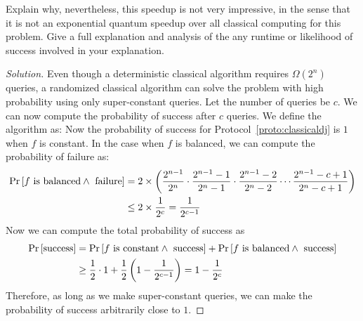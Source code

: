 \begin{solution}[label=ques:1c]
  \begin{question}
    Explain why, nevertheless, this speedup is not very
impressive, in the sense that it is not an exponential quantum speedup over all
classical computing for this problem. Give a full explanation and analysis of the
any runtime or likelihood of success involved in your explanation.
  \end{question}
  \tcblower{}
  \begin{proof}[Solution]
    Even though a deterministic classical algorithm requires $\Omega(2^n)$ queries, a randomized classical algorithm can solve the problem with high probability using only super-constant queries. Let the number of queries be $c$. We can now compute the probability of success after $c$ queries. We define the algorithm as:
    Now the probability of success for Protocol~\ref{proto:classicaldj} is $1$ when $f$ is constant. In the case when $f$ is balanced, we can compute the probability of failure as:
    \begin{equation}
      \begin{split}
        \Pr\left[ f\text{ is balanced}\wedge\text{ failure} \right] &= 2\times\left(\frac{2^{n-1}}{2^n}\cdot\frac{2^{n-1} - 1}{2^n - 1}\cdot\frac{2^{n-1} - 2}{2^n - 2}\cdots\frac{2^{n-1} - c + 1}{2^n - c + 1}\right)\\
        &\leq 2\times \frac{1}{2^c} = \frac{1}{2^{c-1}}
      \end{split}
      \label{eq:djfail}
    \end{equation}
    Now we can compute the total probability of success as
    \begin{equation}
      \begin{split}
        \Pr\left[ \text{success} \right] &= \Pr\left[ f\text{ is constant}\wedge\text{ success} \right] + \Pr\left[ f\text{ is balanced}\wedge\text{ success} \right]\\
        &\geq \frac{1}{2}\cdot 1 + \frac{1}{2}\left(1 - \frac{1}{2^{c-1}}\right) = 1 - \frac{1}{2^c}
      \end{split}
      \label{eq:djsucc}
    \end{equation}
    Therefore, as long as we make super-constant queries, we can make the probability of success arbitrarily close to $1$.
  \end{proof}
\end{solution}
